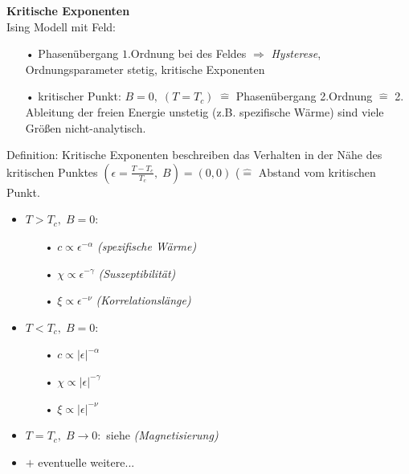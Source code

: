 \documentclass[12pt]{article}
\begin{document}
\textbf{Kritische Exponenten} \\
Ising Modell mit Feld:
\begin{itemize}
\item[•] Phasenübergang $1.$Ordnung bei %
des Feldes $\Rightarrow$ \textit{Hysterese}, Ordnungsparameter stetig, kritische Exponenten

\item[•] kritischer Punkt: $B=0, \; (T= T_c) \;  \widehat{=}$ Phasenübergang 2.Ordnung $\widehat{=} $ 2. Ableitung der freien Energie unstetig (z.B. spezifische Wärme) %
sind viele Größen nicht-analytisch. 
\end{itemize}
Definition: Kritische Exponenten beschreiben das Verhalten in der Nähe des kritischen Punktes $(\epsilon = \frac{T - T_c}{T_c} , \;  B) = (0,0)$  ($\widehat{=}$ Abstand vom kritischen Punkt. 
\begin{itemize}
\item $T>T_c, \; B=0 : $ 
\begin{itemize}
\item[•] $c \propto \epsilon^{-\alpha}$ \textit{(spezifische Wärme)}
\item[•] $\chi \propto \epsilon^{-\gamma}$ \textit{(Suszeptibilität)}
\item[•]$\xi \propto \epsilon^{-\nu}$ \textit{(Korrelationslänge)}
\end{itemize}

\item $T<T_c, \; B=0 :$
\begin{itemize}
\item[•] $c \propto \vert \epsilon \vert ^{-\alpha}$ 
\item[•] $\chi \propto \vert \epsilon \vert ^{-\gamma}$
\item[•]$\xi \propto \vert \epsilon \vert ^{-\nu}$ 
\end{itemize}

\item $T=T_c, \; B \to 0:$ siehe \textit{(Magnetisierung)}

\item $+$ eventuelle weitere...
\end{itemize}
  
\end{document}
